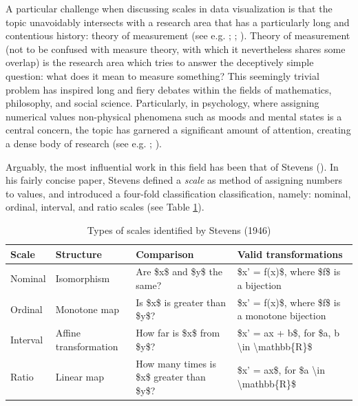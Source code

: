 \documentclass[
]{book}
\theoremstyle{definition}
\theoremstyle{definition}
\theoremstyle{definition}
\theoremstyle{definition}
\theoremstyle{remark}
\begin{document}
A particular challenge when discussing scales in data visualization is that the topic unavoidably intersects with a research area that has a particularly long and contentious history: theory of measurement (see e.g. ; ; ). Theory of measurement (not to be confused with measure theory, with which it nevertheless shares some overlap) is the research area which tries to answer the deceptively simple question: what does it mean to measure something? This seemingly trivial problem has inspired long and fiery debates within the fields of mathematics, philosophy, and social science. Particularly, in psychology, where assigning numerical values non-physical phenomena such as moods and mental states is a central concern, the topic has garnered a significant amount of attention, creating a dense body of research (see e.g. ; ).

Arguably, the most influential work in this field has been that of Stevens (). In his fairly concise paper, Stevens defined a \emph{scale} as method of assigning numbers to values, and introduced a four-fold classification classification, namely: nominal, ordinal, interval, and ratio scales (see Table \ref{tab:stevens-scales}).

\begin{table}

\caption{\label{tab:stevens-scales}Types of scales identified by Stevens (1946)}
\centering
\begin{tabular}[t]{l|l|l|l}
\hline
Scale & Structure & Comparison & Valid transformations\\
\hline
Nominal & Isomorphism & Are \$x\$ and \$y\$ the same? & \$x' = f(x)\$, where \$f\$ is a bijection\\
\hline
Ordinal & Monotone map & Is \$x\$ is greater than \$y\$? & \$x' = f(x)\$, where \$f\$ is a monotone bijection\\
\hline
Interval & Affine transformation & How far is \$x\$ from \$y\$? & \$x' = ax + b\$, for \$a, b \textbackslash{}in \textbackslash{}mathbb\{R\}\$\\
\hline
Ratio & Linear map & How many times is \$x\$ greater than \$y\$? & \$x' = ax\$, for \$a \textbackslash{}in \textbackslash{}mathbb\{R\}\$\\
\hline
\end{tabular}
\end{table}
\end{document}
